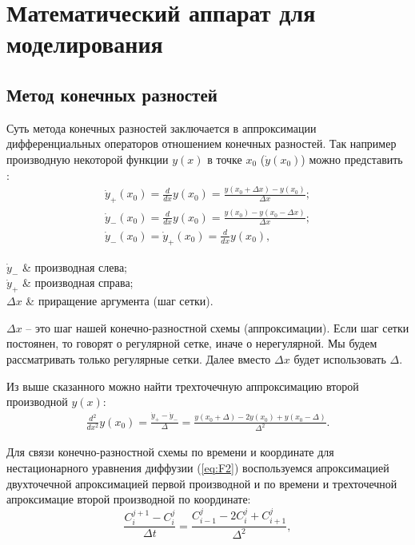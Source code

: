 \chapter{Математический аппарат для моделирования}

\section{Метод конечных разностей}
Суть метода конечных разностей заключается в аппроксимации дифференциальных операторов отношением конечных разностей. Так например производную некоторой функции $y(x)$ в точке $x_{0}$ ($\dot{y}(x_{0})$) можно представить \cite{Samarski}:
\begin{gather}
	\dot{y}_{+}(x_{0}) = \frac{d}{dx}y(x_{0}) = \frac{y(x_{0} + \Delta x) - y(x_{0})}{\Delta x };\\
	\dot{y}_{-}(x_{0}) = \frac{d}{dx}y(x_{0}) = \frac{ y(x_{0}) - y(x_{0} - \Delta x)}{\Delta x };\\
	\dot{y}_{-}(x_{0}) = \dot{y}_{+}(x_{0}) = \frac{d}{dx}y(x_{0}),
\end{gather}
\begin{conditions}
	$\dot{y}_{-}$ & производная слева;\\
	$\dot{y}_{+}$ & производная справа;\\
	$\Delta x$ & приращение аргумента (шаг сетки).
\end{conditions}

$\Delta x$ -- это шаг нашей конечно-разностной схемы (аппроксимации). Если шаг сетки постоянен, то говорят о регулярной сетке, иначе о нерегулярной. Мы будем рассматривать только регулярные сетки. Далее вместо $\Delta x$ будет использовать $\Delta$.

Из выше сказанного можно найти трехточечную аппроксимацию второй производной $y(x)$:
\begin{gather}
	\label{eq:3dots}
	\frac{d^{2}}{dx^{2}}y(x_{0}) = \frac{\dot{y}_{+} - \dot{y}_{-}}{\Delta} = \frac{y(x_{0} + \Delta) - 2y(x_{0}) + y(x_{0} - \Delta)}{ \Delta^{2}}.
\end{gather}

Для связи конечно-разностной схемы по времени и координате для нестационарного уравнения диффузии (\ref{eq:F2}) воспользуемся апроксимацией двухточечной апроксимацией первой производной и по времени и трехточечной апроксимацие второй производной по координате: 
\begin{equation}
	\label{eq:xt}
	\frac{C^{j+1}_{i} - C^{j}_{i}}{\Delta t} = \frac{C^{j}_{i-1} - 2C^{j}_{i} + C^{j}_{i+1}}{ \Delta^{2}},
\end{equation}

